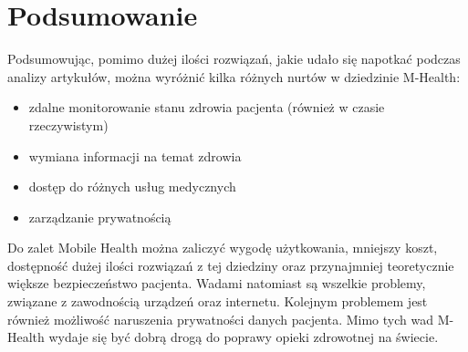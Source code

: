 \chapter{Podsumowanie}
\label{cha:podsumowanie}

Podsumowując, pomimo dużej ilości rozwiązań, jakie udało się napotkać podczas analizy artykułów, można wyróżnić kilka różnych nurtów w dziedzinie M-Health:
\begin{itemize}
\item zdalne monitorowanie stanu zdrowia pacjenta (również w czasie rzeczywistym)
\item wymiana informacji na temat zdrowia
\item dostęp do różnych usług medycznych
\item zarządzanie prywatnością
\end{itemize}
Do zalet Mobile Health można zaliczyć wygodę użytkowania, mniejszy koszt, dostępność dużej ilości rozwiązań z tej dziedziny oraz przynajmniej teoretycznie większe bezpieczeństwo pacjenta. Wadami natomiast są wszelkie problemy, związane z zawodnością urządzeń oraz internetu. Kolejnym problemem jest również możliwość naruszenia prywatności danych pacjenta. Mimo tych wad M-Health wydaje się być dobrą drogą do poprawy opieki zdrowotnej na świecie.
 
